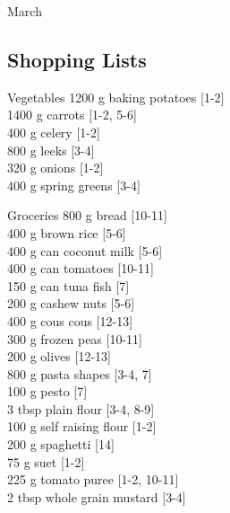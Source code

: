 \begin{menu}{March}
    \subsection*{Shopping Lists}
      \begin{shoppinglist}{Vegetables}
      1200 g baking potatoes 
        {\scriptsize[1-2]}\\
      1400 g carrots 
        {\scriptsize[1-2, 5-6]}\\
      400 g celery 
        {\scriptsize[1-2]}\\
      800 g leeks 
        {\scriptsize[3-4]}\\
      320 g onions 
        {\scriptsize[1-2]}\\
      400 g spring greens 
        {\scriptsize[3-4]}\\
      \end{shoppinglist}%
      \begin{shoppinglist}{Groceries}
      800 g bread 
        {\scriptsize[10-11]}\\
      400 g brown rice 
        {\scriptsize[5-6]}\\
      400 g can coconut milk 
        {\scriptsize[5-6]}\\
      400 g can tomatoes 
        {\scriptsize[10-11]}\\
      150 g can tuna fish 
        {\scriptsize[7]}\\
      200 g cashew nuts 
        {\scriptsize[5-6]}\\
      400 g cous cous 
        {\scriptsize[12-13]}\\
      300 g frozen peas 
        {\scriptsize[10-11]}\\
      200 g olives 
        {\scriptsize[12-13]}\\
      800 g pasta shapes 
        {\scriptsize[3-4, 7]}\\
      100 g pesto 
        {\scriptsize[7]}\\
      3 tbsp plain flour 
        {\scriptsize[3-4, 8-9]}\\
      100 g self raising flour 
        {\scriptsize[1-2]}\\
      200 g spaghetti 
        {\scriptsize[14]}\\
      75 g suet 
        {\scriptsize[1-2]}\\
      225 g tomato puree 
        {\scriptsize[1-2, 10-11]}\\
      2 tbsp whole grain mustard 
        {\scriptsize[3-4]}\\

\end{shoppinglist}
\end{menu}

